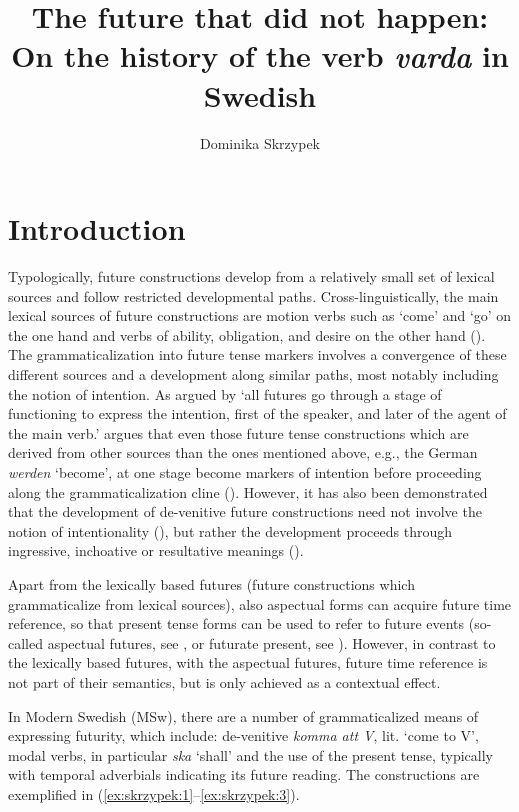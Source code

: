 \documentclass[output=paper,colorlinks,citecolor=brown]{langscibook}
\author{Dominika Skrzypek\orcid{}\affiliation{Adam Mickiewicz University Poznań}}
\title[The future that did not happen]{The future that did not happen: On the history of the verb \textit{varda} in Swedish}
\begin{document}
\maketitle

\section{Introduction} \label{sec:skrzypek:1}
Typologically, future constructions develop from a relatively small set of lexical sources and follow restricted developmental paths. Cross-linguistically, the main lexical sources of future constructions are motion verbs such as ‘come’ and ‘go’ on the one hand and verbs of ability, obligation, and desire on the other hand (\cite{Heine1995}). The grammaticalization into future tense markers involves a convergence of these different sources and a development along similar paths, most notably including the notion of intention. As argued by \citet[254]{BybeePerkinsPagliuca1994} ‘all futures go through a stage of functioning to express the intention, first of the speaker, and later of the agent of the main verb.’ \citet{Heine1995} argues that even those future tense constructions which are derived from other sources than the ones mentioned above, e.g., the German \textit{werden} ‘become’, at one stage become markers of intention before proceeding along the grammaticalization cline (\cite[127]{Heine1995}). However, it has also been demonstrated that the development of de-venitive future constructions need not involve the notion of intentionality (\cite[322]{Dahl2000}), but rather the development proceeds through ingressive, inchoative or resultative meanings (\cite[378]{Traugott1978}). 

Apart from the lexically based futures (future constructions which grammaticalize from lexical sources), also aspectual forms can acquire future time reference, so that present tense forms can be used to refer to future events (so-called aspectual futures, see \citealt[275]{BybeePerkinsPagliuca1994}, or futurate present, see \citealt[157--180]{Hilpert2008}). However, in contrast to the lexically based futures, with the aspectual futures, future time reference is not part of their semantics, but is only achieved as a contextual effect. 

In Modern Swedish (MSw), there are a number of grammaticalized means of expressing futurity, which include: de-venitive \textit{komma att V}, lit. ‘come to V’, modal verbs, in particular \textit{ska} ‘shall’ and the use of the present tense, typically with temporal adverbials indicating its future reading. The constructions are exemplified in (\ref{ex:skrzypek:1}--\ref{ex:skrzypek:3}).
\end{document}
